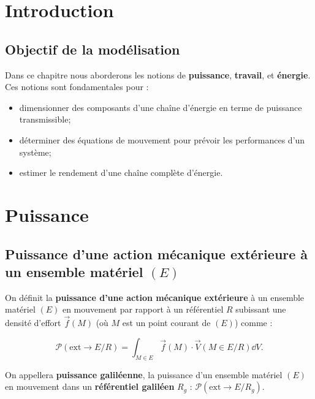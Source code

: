 \documentclass[10pt,fleqn]{article} %
\begin{document}

\setlength{\columnseprule}{.1pt}

\vspace{2cm}
\pagestyle{fancy}
\thispagestyle{plain}





\section{Introduction}
\subsection{Objectif de la modélisation}
Dans ce chapitre nous aborderons les notions de \textbf{puissance}, \textbf{travail}, et \textbf{énergie}. Ces notions sont fondamentales pour :
\begin{itemize}
\item dimensionner des composants d'une chaîne d'énergie en terme de puissance transmissible;
\item déterminer des équations de mouvement pour prévoir les performances d'un système;
\item estimer le rendement d'une chaîne complète d'énergie.
\end{itemize}



\section{Puissance}
\subsection{Puissance d'une action mécanique extérieure à un ensemble matériel $(E)$}
\begin{defi}%
On définit la \textbf{puissance d'une action mécanique extérieure} à un ensemble matériel $(E)$ en mouvement par rapport à un référentiel $R$ subissant une densité d'effort $\overrightarrow{f}(M)$ (où $M$ est un point courant de $(E)$) comme :

$$
\mathcal{P}(\text{ext} \rightarrow E/R)=\displaystyle{\int_{M\in E}}\overrightarrow{f}(M)\cdot \overrightarrow{V}(M\in E/R)\dd V.
$$
\end{defi}

\begin{rem}%
On appellera \textbf{puissance galiléenne}, la puissance d'un ensemble matériel $(E)$ en mouvement dans un \textbf{référentiel galiléen} $R_g$ : 
$
\mathcal{P}(\text{ext} \rightarrow E/R_g)
$.
\end{rem}%
\end{document}
